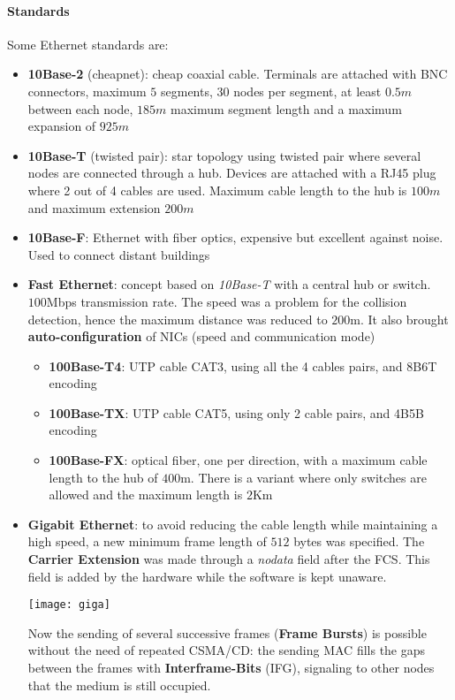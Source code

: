 \paragraph{Standards} Some Ethernet standards are:
\begin{itemize}
	\item \textbf{10Base-2} (cheapnet): cheap coaxial cable. Terminals are attached with BNC connectors, maximum $5$ segments, $30$ nodes per segment, at least $0.5m$ between each node, $185m$ maximum segment length and a maximum expansion of $925m$
	\item \textbf{10Base-T} (twisted pair): star topology using twisted pair where several nodes are connected through a hub. Devices are attached with a RJ45 plug where 2 out of 4 cables are used. Maximum cable length to the hub is $100m$ and maximum extension $200m$
	\item \textbf{10Base-F}: Ethernet with fiber optics, expensive but excellent against noise. Used to connect distant buildings
	\item \textbf{Fast Ethernet}: concept based on \textit{10Base-T} with a central hub or switch. $100$Mbps transmission rate. The speed was a problem for the collision detection, hence the maximum distance was reduced to $200$m. It also brought \textbf{auto-configuration} of NICs (speed and communication mode)
	\begin{itemize}
		\item \textbf{100Base-T4}: UTP cable CAT3, using all the 4 cables pairs, and 8B6T encoding
		\item \textbf{100Base-TX}: UTP cable CAT5, using only 2 cable pairs, and 4B5B encoding
		\item \textbf{100Base-FX}: optical fiber, one per direction, with a maximum cable length to the hub of $400$m. There is a variant where only switches are allowed and the maximum length is $2$Km
	\end{itemize}
	\item \textbf{Gigabit Ethernet}: to avoid reducing the cable length while maintaining a high speed, a new minimum frame length of $512$ bytes was specified. The \textbf{Carrier Extension} was made through a \textit{nodata} field after the FCS. This field is added by the hardware while the software is kept unaware.
	\begin{center}
		\texttt{[image: giga]}
	\end{center}
	Now the sending of several successive frames (\textbf{Frame Bursts}) is possible without the need of repeated CSMA/CD: the sending MAC fills the gaps between the frames with \textbf{Interframe-Bits} (IFG), signaling to other nodes that the medium is still occupied.

\end{itemize}
